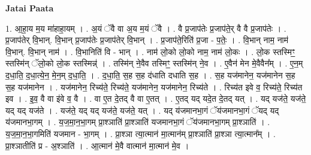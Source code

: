 \documentclass[17pt]{extarticle}
\begin{document}
\textbf{Jatai Paata} \newline

1. आ॒हा॒य म॒य मा॑हाहा॒यम् । . अ॒यं ॅवै वा अ॒य म॒यं ॅवै । . वै प्र॒जाप॑तेः प्र॒जाप॑ते॒र् वै वै प्र॒जाप॑तेः । . प्र॒जाप॑तेर् वि॒भान्. वि॒भान् प्र॒जाप॑तेः प्र॒जाप॑तेर् वि॒भान् । . प्र॒जाप॑ते॒रिति॑ प्र॒जा - प॒तेः॒ । . वि॒भान् नाम॒ नाम॑ वि॒भान्. वि॒भान् नाम॑ । . वि॒भानिति॑ वि - भान् । . नाम॑ लो॒को लो॒को नाम॒ नाम॑ लो॒कः । . लो॒क स्तस्मिꣳ॒॒ स्तस्मि॑न् ॅलो॒को लो॒क स्तस्मिन्न्॑ । . तस्मि॑न् ने॒वैव तस्मिꣳ॒॒ स्तस्मि॑न् ने॒व । . ए॒वैन॑ मेन मे॒वैवैन᳚म् । . ए॒न॒म् द॒धा॒ति॒ द॒धा॒त्ये॒न॒ मे॒न॒म् द॒धा॒ति॒ । . द॒धा॒ति॒ स॒ह स॒ह द॑धाति दधाति स॒ह । . स॒ह यज॑मानेन॒ यज॑मानेन स॒ह स॒ह यज॑मानेन । . यज॑मानेन॒ रिच्य॑ते॒ रिच्य॑ते॒ यज॑मानेन॒ यज॑मानेन॒ रिच्य॑ते । . रिच्य॑त इवे व॒ रिच्य॑ते॒ रिच्य॑त इव । . इ॒व॒ वै वा इ॑वे व॒ वै । . वा ए॒त दे॒तद् वै वा ए॒तत् । . ए॒तद् यद् यदे॒त दे॒तद् यत् । . यद् यज॑ते॒ यज॑ते॒ यद् यद् यज॑ते । . यज॑ते॒ यद् यद् यज॑ते॒ यज॑ते॒ यत् । . यद् य॑जमानभा॒गं ॅय॑जमानभा॒गं ॅयद् यद् य॑जमानभा॒गम् । . य॒ज॒मा॒न॒भा॒गम् प्रा॒श्ञाति॑ प्रा॒श्ञाति॑ यजमानभा॒गं ॅय॑जमानभा॒गम् प्रा॒श्ञाति॑ । . य॒ज॒मा॒न॒भा॒गमिति॑ यजमान - भा॒गम् । . प्रा॒श्ञा त्या॒त्मान॑ मा॒त्मान॑म् प्रा॒श्ञाति॑ प्रा॒श्ञा त्या॒त्मान᳚म् । . प्रा॒श्ञातीति॑ प्र - अ॒श्ञाति॑ । . आ॒त्मान॑ मे॒वै वात्मान॑ मा॒त्मान॑ मे॒व । \newline
\end{document}
